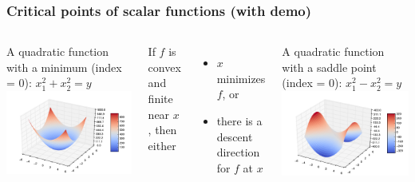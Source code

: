 \documentclass{beamer}
\begin{document}
\begin{frame}
\frametitle{Critical points of scalar functions (with demo)}

\begin{columns}

A quadratic function with a minimum (index = 0): $x_1^2 + x_2^2 = y$
\includegraphics[scale = 0.34]{figures/localmin.pdf}

If $f$ is convex and finite near $x$, then either
\begin{itemize}
\item $x$ minimizes $f$, or
\item there is a descent direction for $f$ at $x$
\end{itemize}

A quadratic function with a saddle point (index = 0): $x_1^2 - x_2^2 = y$
\includegraphics[scale = 0.34]{figures/saddle.pdf}


\end{columns}
\end{frame}
\end{document}
